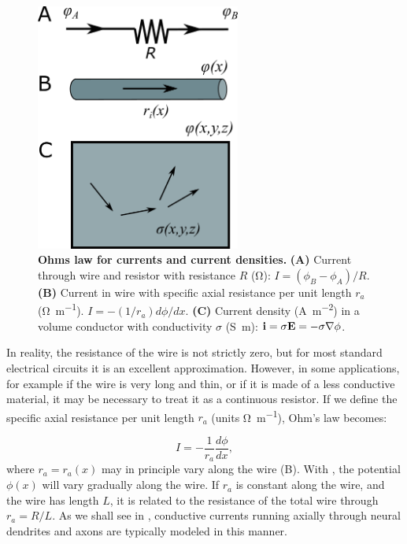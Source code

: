 \begin{figure}[!ht]
\begin{center}
\includegraphics[width=0.6\textwidth]{Figures/Basics/Currents.png}
\end{center}
\caption{{\bf Ohms law for currents and current densities.} {\bf (A)} Current through wire and resistor with resistance $R$ (\si{\ohm}): $I = (\phi_B-\phi_A)/R$. {\bf (B)} Current in wire with specific axial resistance per unit length $r_a$ (\si{\ohm\per\metre}).  $I=- (1/r_a) d\phi/dx$. {\bf (C)} Current density (\si{\ampere\per\square\metre}) in a volume conductor with conductivity $\sigma$ (\si{\siemens\metre}): ${\bf i} = \sigma {\bf E} = - \sigma {\bf \nabla} \phi$.}
\label{fig:Basics:Currents}
\end{figure}

In reality, the resistance of the wire is not strictly zero, but for most standard electrical circuits it is an excellent approximation. However, in some applications, for example if the wire is very long and thin, or if it is made of a less conductive material, it may be necessary to treat it as a continuous resistor. If we define the specific axial resistance per unit length $r_{a}$ (units \si{\ohm\per\metre}), Ohm's law becomes:

\begin{equation}
I = - \frac{1}{r_a}\frac{d\phi}{dx},
\label{eq:Basics:Ohm_r}
\end{equation}
where $r_a=r_a(x)$ may in principle vary along the wire (B). With , the potential $\phi(x)$ will vary gradually along the wire. If $r_a$ is constant along the wire, and the wire has length $L$, it is related to the resistance of the total wire through $r_a=R/L$. As we shall see in , conductive currents running axially through neural dendrites and axons are typically modeled in this manner. 

